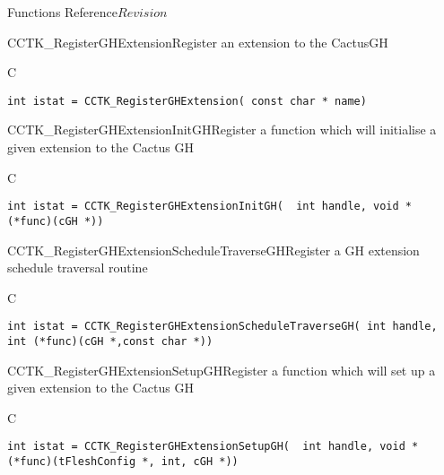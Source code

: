 \begin{cactuspart}{ Functions Reference}{}{$Revision$}
\begin{FunctionDescription}{CCTK\_RegisterGHExtension}{Register an extension to the CactusGH}
\label{CCTK-RegisterGHExtension}
\begin{SynopsisSection}
\begin{Synopsis}{C}
\begin{verbatim}int istat = CCTK_RegisterGHExtension( const char * name)\end{verbatim}
\end{Synopsis}
\end{SynopsisSection}
\end{FunctionDescription}

\begin{FunctionDescription}{CCTK\_RegisterGHExtensionInitGH}{Register a function which will initialise a given extension to the Cactus GH}
\label{CCTK-RegisterGHExtensionInitGH}
\begin{SynopsisSection}
\begin{Synopsis}{C}
\begin{verbatim}int istat = CCTK_RegisterGHExtensionInitGH(  int handle, void * (*func)(cGH *))\end{verbatim}
\end{Synopsis}
\end{SynopsisSection}
\end{FunctionDescription}

\begin{FunctionDescription}{CCTK\_RegisterGHExtensionScheduleTraverseGH}{Register a GH extension schedule traversal routine}
\label{CCTK-RegisterGHExtensionScheduleTraverseGH}
\begin{SynopsisSection}
\begin{Synopsis}{C}
\begin{verbatim}int istat = CCTK_RegisterGHExtensionScheduleTraverseGH( int handle, int (*func)(cGH *,const char *))\end{verbatim}
\end{Synopsis}
\end{SynopsisSection}
\end{FunctionDescription}

\begin{FunctionDescription}{CCTK\_RegisterGHExtensionSetupGH}{Register a function which will set up a given extension to the Cactus GH}
\label{CCTK-RegisterGHExtensionSetupGH}
\begin{SynopsisSection}
\begin{Synopsis}{C}
\begin{verbatim}int istat = CCTK_RegisterGHExtensionSetupGH(  int handle, void * (*func)(tFleshConfig *, int, cGH *))\end{verbatim}
\end{Synopsis}
\end{SynopsisSection}
\end{FunctionDescription}


\end{cactuspart}
